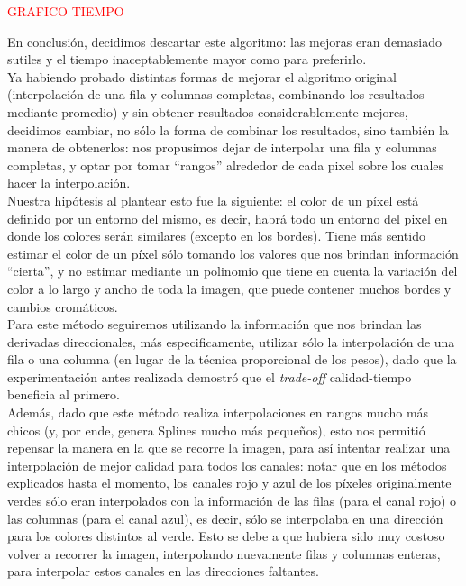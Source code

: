 \documentclass[a4paper]{article}
\begin{document}
\textcolor{red}{GRAFICO TIEMPO\\}

En conclusión, decidimos descartar este algoritmo: las mejoras eran demasiado sutiles y el tiempo inaceptablemente mayor como para preferirlo.\\

Ya habiendo probado distintas formas de mejorar el algoritmo original (interpolación de una fila y columnas completas, combinando los resultados mediante promedio) y sin obtener resultados considerablemente mejores, decidimos cambiar, no sólo la forma de combinar los resultados, sino también la manera de obtenerlos: nos propusimos dejar de interpolar una fila y columnas completas, y optar por tomar ``rangos'' alrededor de cada pixel sobre los cuales hacer la interpolación. \\

Nuestra hipótesis al plantear esto fue la siguiente: el color de un píxel está definido por un entorno del mismo, es decir, habrá todo un entorno del pixel en donde los colores serán similares (excepto en los bordes). Tiene más sentido estimar el color de un píxel sólo tomando los valores que nos brindan información ``cierta'', y no estimar mediante un polinomio que tiene en cuenta la variación del color a lo largo y ancho de toda la imagen, que puede contener muchos bordes y cambios cromáticos. \\

Para este método seguiremos utilizando la información que nos brindan las derivadas direccionales, más especificamente, utilizar sólo la interpolación de una fila o una columna (en lugar de la técnica proporcional de los pesos), dado que la experimentación antes realizada demostró que el \textit{trade-off} calidad-tiempo beneficia al primero. \\

Además, dado que este método realiza interpolaciones en rangos mucho más chicos (y, por ende, genera Splines mucho más pequeños), esto nos permitió repensar la manera en la que se recorre la imagen, para así intentar realizar una interpolación de mejor calidad para todos los canales: notar que en los métodos explicados hasta el momento, los canales rojo y azul de los píxeles originalmente verdes sólo eran interpolados con la información de las filas (para el canal rojo) o las columnas (para el canal azul), es decir, sólo se interpolaba en una dirección para los colores distintos al verde. Esto se debe a que hubiera sido muy costoso volver a recorrer la imagen, interpolando nuevamente filas y columnas enteras, para interpolar estos canales en las direcciones faltantes.\\
\end{document}
